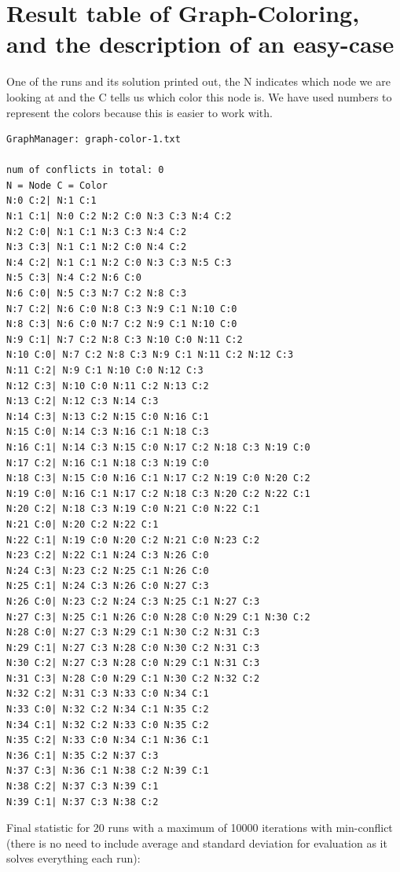 \documentclass[12pt, a4paper]{article}
\begin{document}
\section{Result table of Graph-Coloring, and the description of an easy-case}
One of the runs and its solution printed out, the N indicates which node we are looking at and the C tells us which color this node is. We have used numbers to represent the colors because this is easier to work with.\\
\begin{verbatim}
GraphManager: graph-color-1.txt

num of conflicts in total: 0
N = Node C = Color
N:0 C:2| N:1 C:1 
N:1 C:1| N:0 C:2 N:2 C:0 N:3 C:3 N:4 C:2 
N:2 C:0| N:1 C:1 N:3 C:3 N:4 C:2 
N:3 C:3| N:1 C:1 N:2 C:0 N:4 C:2 
N:4 C:2| N:1 C:1 N:2 C:0 N:3 C:3 N:5 C:3 
N:5 C:3| N:4 C:2 N:6 C:0 
N:6 C:0| N:5 C:3 N:7 C:2 N:8 C:3 
N:7 C:2| N:6 C:0 N:8 C:3 N:9 C:1 N:10 C:0 
N:8 C:3| N:6 C:0 N:7 C:2 N:9 C:1 N:10 C:0 
N:9 C:1| N:7 C:2 N:8 C:3 N:10 C:0 N:11 C:2 
N:10 C:0| N:7 C:2 N:8 C:3 N:9 C:1 N:11 C:2 N:12 C:3 
N:11 C:2| N:9 C:1 N:10 C:0 N:12 C:3 
N:12 C:3| N:10 C:0 N:11 C:2 N:13 C:2 
N:13 C:2| N:12 C:3 N:14 C:3 
N:14 C:3| N:13 C:2 N:15 C:0 N:16 C:1 
N:15 C:0| N:14 C:3 N:16 C:1 N:18 C:3 
N:16 C:1| N:14 C:3 N:15 C:0 N:17 C:2 N:18 C:3 N:19 C:0 
N:17 C:2| N:16 C:1 N:18 C:3 N:19 C:0 
N:18 C:3| N:15 C:0 N:16 C:1 N:17 C:2 N:19 C:0 N:20 C:2 
N:19 C:0| N:16 C:1 N:17 C:2 N:18 C:3 N:20 C:2 N:22 C:1 
N:20 C:2| N:18 C:3 N:19 C:0 N:21 C:0 N:22 C:1 
N:21 C:0| N:20 C:2 N:22 C:1 
N:22 C:1| N:19 C:0 N:20 C:2 N:21 C:0 N:23 C:2 
N:23 C:2| N:22 C:1 N:24 C:3 N:26 C:0 
N:24 C:3| N:23 C:2 N:25 C:1 N:26 C:0 
N:25 C:1| N:24 C:3 N:26 C:0 N:27 C:3 
N:26 C:0| N:23 C:2 N:24 C:3 N:25 C:1 N:27 C:3 
N:27 C:3| N:25 C:1 N:26 C:0 N:28 C:0 N:29 C:1 N:30 C:2 
N:28 C:0| N:27 C:3 N:29 C:1 N:30 C:2 N:31 C:3 
N:29 C:1| N:27 C:3 N:28 C:0 N:30 C:2 N:31 C:3 
N:30 C:2| N:27 C:3 N:28 C:0 N:29 C:1 N:31 C:3 
N:31 C:3| N:28 C:0 N:29 C:1 N:30 C:2 N:32 C:2 
N:32 C:2| N:31 C:3 N:33 C:0 N:34 C:1 
N:33 C:0| N:32 C:2 N:34 C:1 N:35 C:2 
N:34 C:1| N:32 C:2 N:33 C:0 N:35 C:2 
N:35 C:2| N:33 C:0 N:34 C:1 N:36 C:1 
N:36 C:1| N:35 C:2 N:37 C:3 
N:37 C:3| N:36 C:1 N:38 C:2 N:39 C:1 
N:38 C:2| N:37 C:3 N:39 C:1 
N:39 C:1| N:37 C:3 N:38 C:2 

\end{verbatim}
\noindent
Final statistic for 20 runs with a maximum of 10000 iterations with min-conflict (there is no need to include average and standard deviation for evaluation as it solves everything each run):\\
\end{document}

